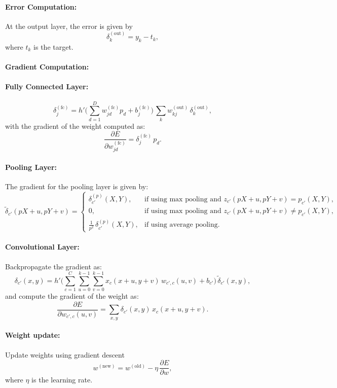 \documentclass[11pt]{article}
\begin{document}
\paragraph{\normalsize Error Computation:}
At the output layer, the error is given by
\[
\delta_k^{(\mathrm{out})} = y_k - t_k,
\]
where \(t_k\) is the target.

\paragraph{\normalsize Gradient Computation:}

\paragraph{\normalsize Fully Connected Layer:}
\[
\delta_j^{(\mathrm{fc})} 
  = h'\!\Biggl( \sum_{d=1}^{D} w_{j d}^{(\mathrm{fc})} p_d + b_j^{(\mathrm{fc})} \Biggr)\,\sum_{k} w_{kj}^{(\mathrm{out})}\,\delta_k^{(\mathrm{out})},
\]
with the gradient of the weight computed as:
\[
\frac{\partial E}{\partial w_{jd}^{(\mathrm{fc})}} = \delta_j^{(\mathrm{fc})}\, p_{d}.
\]

\paragraph{\normalsize Pooling Layer:}
The gradient for the pooling layer is given by:
\[
\tilde{\delta}_{c'}(pX+u, pY+v) = 
\begin{cases}
\delta_{c'}^{(p)}(X,Y), & \text{if using max pooling and } z_{c'}(pX+u, pY+v) = p_{c'}(X,Y),\\[2mm]
0, & \text{if using max pooling and } z_{c'}(pX+u, pY+v) \neq p_{c'}(X,Y),\\[2mm]
\displaystyle \frac{1}{p^2}\,\delta_{c'}^{(p)}(X,Y), & \text{if using average pooling.}
\end{cases}
\]


\paragraph{\normalsize Convolutional Layer:}
Backpropagate the gradient as: 
\[
\delta_{c'}(x,y) = h'\!\Biggl( \sum_{c=1}^{C}\sum_{u=0}^{k-1} \sum_{v=0}^{k-1} x_c(x+u,y+v)\,w_{c',c}(u,v) + b_{c'} \Biggr)\,\tilde{\delta}_{c'}(x,y),
\]
and compute the gradient of the weight as:
\[
\frac{\partial E}{\partial w_{c',c}(u,v)} = \sum_{x,y} \delta_{c'}(x,y)\,x_c(x+u,y+v).
\]

\paragraph{\normalsize Weight update:}
Update weights using gradient descent
\[
w^{(\mathrm{new})} = w^{(\mathrm{old})} - \eta\, \frac{\partial E}{\partial w},
\]
where \(\eta\) is the learning rate. 
\end{document}
